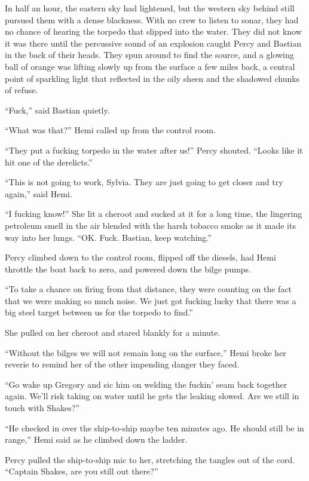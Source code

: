 \documentclass[
]{scrbook}
\begin{document}
In half an hour, the eastern sky had lightened, but the western sky
behind still pursued them with a dense blackness. With no crew to listen
to sonar, they had no chance of hearing the torpedo that slipped into
the water. They did not know it was there until the percussive sound of
an explosion caught Percy and Bastian in the back of their heads. They
spun around to find the source, and a glowing ball of orange was lifting
slowly up from the surface a few miles back, a central point of
sparkling light that reflected in the oily sheen and the shadowed chunks
of refuse.

``Fuck,'' said Bastian quietly.

``What was that?'' Hemi called up from the control room.

``They put a fucking torpedo in the water after us!'' Percy shouted.
``Looks like it hit one of the derelicts.''

``This is not going to work, Sylvia. They are just going to get closer
and try again,'' said Hemi.

``I fucking know!'' She lit a cheroot and sucked at it for a long time,
the lingering petroleum smell in the air blended with the harsh tobacco
smoke as it made its way into her lungs. ``OK. Fuck. Bastian, keep
watching.''

Percy climbed down to the control room, flipped off the diesels, had
Hemi throttle the boat back to zero, and powered down the bilge pumps.

``To take a chance on firing from that distance, they were counting on
the fact that we were making so much noise. We just got fucking lucky
that there was a big steel target between us for the torpedo to find.''

She pulled on her cheroot and stared blankly for a minute.

``Without the bilges we will not remain long on the surface,'' Hemi
broke her reverie to remind her of the other impending danger they
faced.

``Go wake up Gregory and sic him on welding the fuckin' seam back
together again. We'll risk taking on water until he gets the leaking
slowed. Are we still in touch with Shakes?''

``He checked in over the ship-to-ship maybe ten minutes ago. He should
still be in range,'' Hemi said as he climbed down the ladder.

Percy pulled the ship-to-ship mic to her, stretching the tangles out of
the cord. ``Captain Shakes, are you still out there?''
\end{document}
